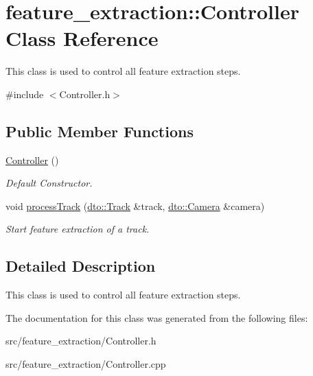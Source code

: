 \hypertarget{classfeature__extraction_1_1_controller}{}\section{feature\+\_\+extraction\+:\+:Controller Class Reference}
\label{classfeature__extraction_1_1_controller}


This class is used to control all feature extraction steps.  




{\ttfamily \#include $<$Controller.\+h$>$}

\subsection*{Public Member Functions}
\begin{DoxyCompactItemize}
\item 
\mbox{\label{classfeature__extraction_1_1_controller_aa227c7a54e560a3751dc330d0d064dbe}} 
\mbox{\hyperlink{classfeature__extraction_1_1_controller_aa227c7a54e560a3751dc330d0d064dbe}{Controller}} ()
\begin{DoxyCompactList}\small\item\em Default Constructor. \end{DoxyCompactList}\item 
\mbox{\label{classfeature__extraction_1_1_controller_ac9839e23c35dd8d3d362aba348af1b02}} 
void \mbox{\hyperlink{classfeature__extraction_1_1_controller_ac9839e23c35dd8d3d362aba348af1b02}{process\+Track}} (\mbox{\hyperlink{structdto_1_1_track}{dto\+::\+Track}} \&track, \mbox{\hyperlink{structdto_1_1_camera}{dto\+::\+Camera}} \&camera)
\begin{DoxyCompactList}\small\item\em Start feature extraction of a track. \end{DoxyCompactList}\end{DoxyCompactItemize}


\subsection{Detailed Description}
This class is used to control all feature extraction steps. 

The documentation for this class was generated from the following files\+:\begin{DoxyCompactItemize}
\item 
src/feature\+\_\+extraction/Controller.\+h\item 
src/feature\+\_\+extraction/Controller.\+cpp\end{DoxyCompactItemize}
